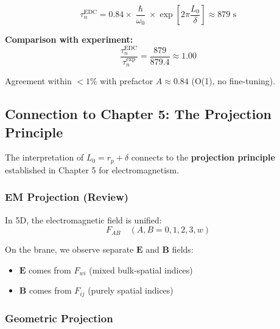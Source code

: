 \documentclass[11pt,a4paper]{article}
\newcommand{\hbar}{\hslash}
\begin{document}
\begin{tcolorbox}[colback=green!5!white, colframe=green!50!black, title=Result]
\begin{equation}
\boxed{\tau_n^{\text{EDC}} = 0.84 \times \frac{\hbar}{\omega_0} \times \exp\left[2\pi \frac{L_0}{\delta}\right] \approx 879 \text{ s}}
\end{equation}

\textbf{Comparison with experiment:}
\begin{equation}
\frac{\tau_n^{\text{EDC}}}{\tau_n^{\text{exp}}} = \frac{879}{879.4} \approx 1.00
\end{equation}

Agreement within $<1\%$ with prefactor $A \approx 0.84$ (O(1), no fine-tuning).
\end{tcolorbox}

\subsection{Connection to Chapter 5: The Projection Principle}

The interpretation of $L_0 = r_p + \delta$ connects to the \textbf{projection principle} established in Chapter 5 for electromagnetism.

\subsubsection{EM Projection (Review)}

In 5D, the electromagnetic field is unified:
\begin{equation}
F_{AB} \quad (A, B = 0, 1, 2, 3, w)
\end{equation}

On the brane, we observe separate $\mathbf{E}$ and $\mathbf{B}$ fields:
\begin{itemize}
\item $\mathbf{E}$ comes from $F_{wi}$ (mixed bulk-spatial indices)
\item $\mathbf{B}$ comes from $F_{ij}$ (purely spatial indices)
\end{itemize}

\subsubsection{Geometric Projection}
\end{document}

